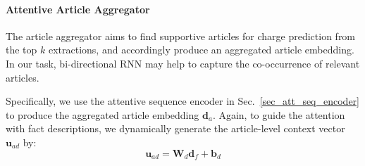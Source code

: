 \paragraph{Attentive Article Aggregator}
The article aggregator aims to find supportive articles for charge prediction from the top $k$ extractions, and accordingly produce an aggregated article embedding.
%
%
% 
In our task, bi-directional RNN may help to capture the co-occurrence of relevant articles.

Specifically, we use the attentive sequence encoder in Sec.~\ref{sec_att_seq_encoder} 
to produce the aggregated article embedding $\mathbf{d}_a$. 
Again, to guide the attention with fact descriptions, we dynamically generate the article-level context vector $\mathbf{u}_{ad}$ by:
\begin{equation}
\mathbf{u}_{ad} = \mathbf{W}_d \mathbf{d}_f + \mathbf{b}_d
\end{equation}


